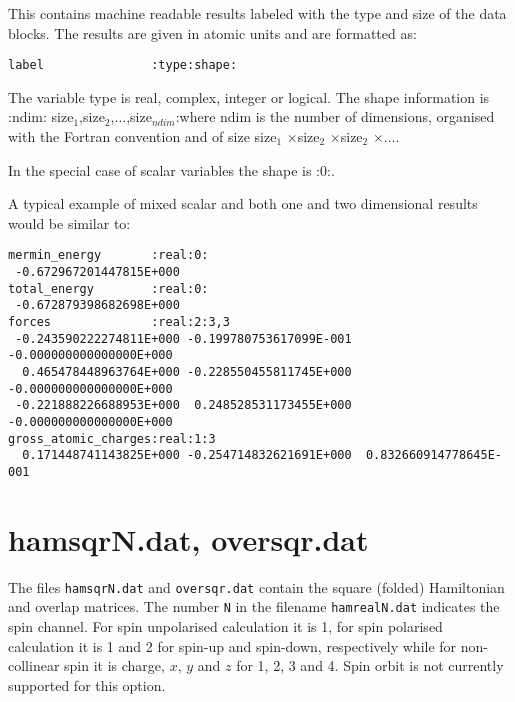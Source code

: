This contains machine readable results labeled with the type and size of the
data blocks. The results are given in atomic units and are formatted as:
\begin{verbatim}
label               :type:shape:
\end{verbatim}

The variable type is real, complex, integer or logical. The shape information is
\newline :ndim: size$_1$,size$_2$,$\ldots$,size$_{ndim}$:\newline where ndim is
the number of dimensions, organised with the Fortran convention and of size
size$_1$ $\times$size$_2$ $\times$size$_2$ $\times \ldots$.

In the special case of scalar variables the shape is :0:.

A typical example of mixed scalar and both one and two dimensional results would
be similar to:
\begin{verbatim}
mermin_energy       :real:0:
 -0.672967201447815E+000
total_energy        :real:0:
 -0.672879398682698E+000
forces              :real:2:3,3
 -0.243590222274811E+000 -0.199780753617099E-001 -0.000000000000000E+000
  0.465478448963764E+000 -0.228550455811745E+000 -0.000000000000000E+000
 -0.221888226688953E+000  0.248528531173455E+000 -0.000000000000000E+000
gross_atomic_charges:real:1:3
  0.171448741143825E+000 -0.254714832621691E+000  0.832660914778645E-001
\end{verbatim}

\section{hamsqrN.dat, oversqr.dat}
\label{sec:dftbp.hamsqr}

The files \verb|hamsqrN.dat| and \verb|oversqr.dat| contain the square
(folded) Hamiltonian and overlap matrices. The number \verb|N| in the
filename \verb|hamrealN.dat| indicates the spin channel. For spin
unpolarised calculation it is 1, for spin polarised calculation it is
1 and 2 for spin-up and spin-down, respectively while for non-collinear
spin it is charge, $x$, $y$ and $z$ for 1, 2, 3 and 4. Spin orbit is
not currently supported for this option.

